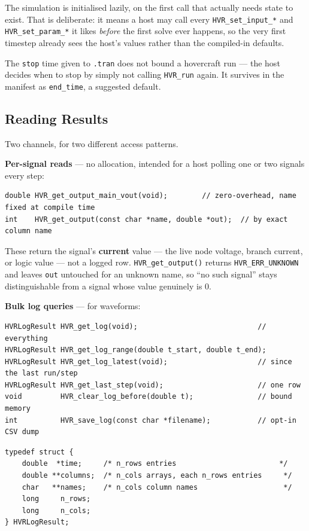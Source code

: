 \documentclass[11pt, a4paper]{article}
\newcommand{\code}[1]{\texttt{\small #1}}
\begin{document}
The simulation is initialised lazily, on the first call that actually needs
state to exist. That is deliberate: it means a host may call every
\code{HVR\_set\_input\_*} and \code{HVR\_set\_param\_*} it likes \textit{before}
the first solve ever happens, so the very first timestep already sees the
host's values rather than the compiled-in defaults.

The \code{stop} time given to \code{.tran} does not bound a hovercraft run ---
the host decides when to stop by simply not calling \code{HVR\_run} again. It
survives in the manifest as \code{end\_time}, a suggested default.

\subsection{Reading Results}

Two channels, for two different access patterns.

\textbf{Per-signal reads} --- no allocation, intended for a host polling one or
two signals every step:

\begin{lstlisting}
double HVR_get_output_main_vout(void);        // zero-overhead, name fixed at compile time
int    HVR_get_output(const char *name, double *out);  // by exact column name
\end{lstlisting}

These return the signal's \textbf{current} value --- the live node voltage,
branch current, or logic value --- not a logged row.
\code{HVR\_get\_output()} returns \code{HVR\_ERR\_UNKNOWN} and leaves
\code{*out} untouched for an unknown name, so ``no such signal'' stays
distinguishable from a signal whose value genuinely is 0.

\textbf{Bulk log queries} --- for waveforms:

\begin{lstlisting}
HVRLogResult HVR_get_log(void);                            // everything
HVRLogResult HVR_get_log_range(double t_start, double t_end);
HVRLogResult HVR_get_log_latest(void);                     // since the last run/step
HVRLogResult HVR_get_last_step(void);                      // one row
void         HVR_clear_log_before(double t);               // bound memory
int          HVR_save_log(const char *filename);           // opt-in CSV dump
\end{lstlisting}

\begin{lstlisting}
typedef struct {
    double  *time;     /* n_rows entries                        */
    double **columns;  /* n_cols arrays, each n_rows entries     */
    char   **names;    /* n_cols column names                    */
    long     n_rows;
    long     n_cols;
} HVRLogResult;
\end{lstlisting}
\end{document}

